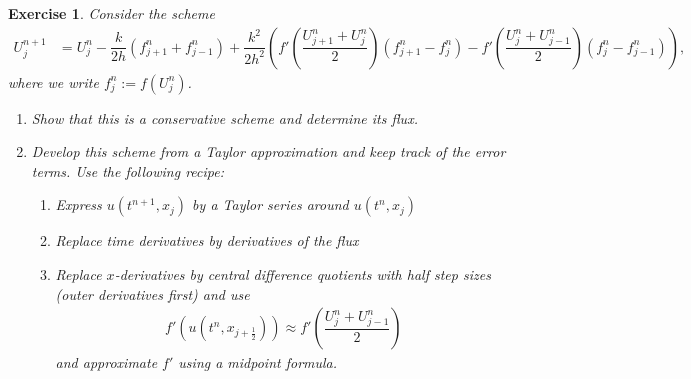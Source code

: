 \documentclass[10pt,letterpaper]{article}
\theoremstyle{break}
\newtheorem{exercise}{Exercise}
\begin{document}
\begin{exercise}
    Consider the scheme
    \begin{align}
     U^{n+1}_{j}
     &
     =
     U^{n  }_{j}
     -
     \dfrac{k}{2h}
     \left(
        f^{n}_{j+1} + f^{n}_{j-1}
     \right)
     +
     \dfrac{k^2}{2 h^2}
     \left(
        f'\left( \dfrac{ U^{n}_{j+1} + U^{n}_{j} }{2} \right)
        \left(
            f^{n}_{j+1} - f^{n}_{j}
        \right)
        -
        f'\left( \dfrac{ U^{n}_{j} + U^{n}_{j-1} }{2} \right)
        \left(
            f^{n}_{j} - f^{n}_{j-1}
        \right)
     \right)     
     ,
    \end{align}
    where we write $f^n_{j} := f\left( U^{n}_{j} \right)$. 
    \begin{enumerate}
        \item Show that this is a conservative scheme and determine its flux.
        \item Develop this scheme from a Taylor approximation and keep track of the error terms. Use the following recipe: 
        \begin{enumerate}
            \item Express $u(t^{n+1},x_{j})$ by a Taylor series around $u(t^{n},x_{j})$
            \item Replace time derivatives by derivatives of the flux
            \item Replace $x$-derivatives by central difference quotients with half step sizes (outer derivatives first) and use 
			\begin{align*}
				f'(u(t^{n},x_{j+\frac 1 2}))
				\approx 
				f'\left( \dfrac{ U^{n}_{j} + U^{n}_{j-1} }{2} \right)
			\end{align*}
            and approximate $f'$ using a midpoint formula. 
        \end{enumerate}
    \end{enumerate}

\end{exercise}
\end{document}

